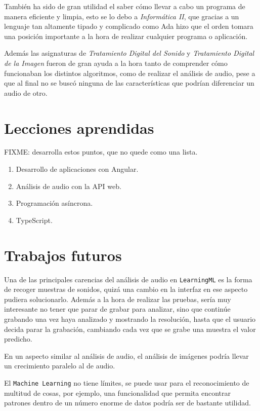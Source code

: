 \documentclass[a4paper, 12pt]{book}
\begin{document}
También ha sido de gran utilidad el saber cómo llevar a cabo un programa de manera eficiente y limpia, esto se lo debo a \textit{Informática II}, que gracias a un lenguaje tan altamente tipado y complicado como Ada hizo que el orden tomara una posición importante a la hora de realizar cualquier programa o aplicación.

Además las asignaturas de \textit{Tratamiento Digital del Sonido} y \textit{Tratamiento Digital de la Imagen} fueron de gran ayuda a la hora tanto de comprender cómo funcionaban los distintos algoritmos, como de realizar el análisis de audio, pese a que al final no se buscó ninguna de las características que podrían diferenciar un audio de otro.


\section{Lecciones aprendidas}
\label{sec:lecciones_aprendidas}

FIXME: desarrolla estos puntos, que no quede como una lista.

\begin{enumerate}
  \item Desarrollo de aplicaciones con Angular.
  \item Análisis de audio con la API web.
  \item Programación asíncrona.
  \item TypeScript.
\end{enumerate}


\section{Trabajos futuros}
\label{sec:trabajos_futuros}

Una de las principales carencias del análisis de audio en \texttt{LearningML} es la forma de recoger muestras de sonidos, quizá una cambio en la interfaz en ese aspecto pudiera solucionarlo. Además a la hora de realizar las pruebas, sería muy interesante no tener que parar de grabar para analizar, sino que continúe grabando una vez haya analizado y mostrando la resolución, hasta que el usuario decida parar la grabación, cambiando cada vez que se grabe una muestra el valor predicho.

En un aspecto similar al análisis de audio, el análisis de imágenes podría llevar un crecimiento paralelo al de audio.

El \texttt{Machine Learning} no tiene límites, se puede usar para el reconocimiento de multitud de cosas, por ejemplo, una funcionalidad que permita encontrar patrones dentro de un número enorme de datos podría ser de bastante utilidad.
\end{document}
